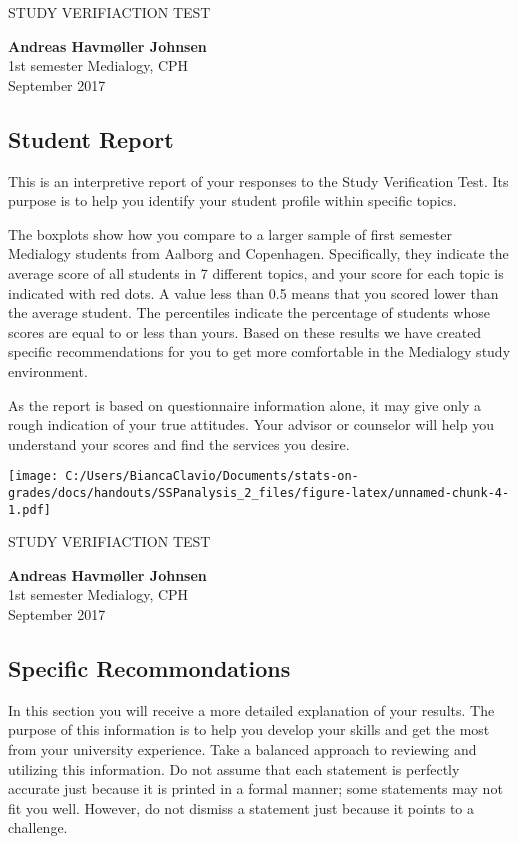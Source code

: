 \documentclass[]{article}
\title{}
\author{}
\date{}
\begin{document}
STUDY VERIFIACTION TEST

\textbf{Andreas Havmøller Johnsen}\\
1st semester Medialogy, CPH\\
September 2017

\subsection{Student Report}\label{student-report}

This is an interpretive report of your responses to the Study
Verification Test. Its purpose is to help you identify your student
profile within specific topics.

The boxplots show how you compare to a larger sample of first semester
Medialogy students from Aalborg and Copenhagen. Specifically, they
indicate the average score of all students in 7 different topics, and
your score for each topic is indicated with red dots. A value less than
0.5 means that you scored lower than the average student. The
percentiles indicate the percentage of students whose scores are equal
to or less than yours. Based on these results we have created specific
recommendations for you to get more comfortable in the Medialogy study
environment.

As the report is based on questionnaire information alone, it may give
only a rough indication of your true attitudes. Your advisor or
counselor will help you understand your scores and find the services you
desire.

\texttt{[image: C:/Users/BiancaClavio/Documents/stats-on-grades/docs/handouts/SSPanalysis\_2\_files/figure-latex/unnamed-chunk-4-1.pdf]}

\pagebreak

STUDY VERIFIACTION TEST

\textbf{Andreas Havmøller Johnsen}\\
1st semester Medialogy, CPH\\
September 2017

\subsection{Specific Recommondations}\label{specific-recommondations}

In this section you will receive a more detailed explanation of your
results. The purpose of this information is to help you develop your
skills and get the most from your university experience. Take a balanced
approach to reviewing and utilizing this information. Do not assume that
each statement is perfectly accurate just because it is printed in a
formal manner; some statements may not fit you well. However, do not
dismiss a statement just because it points to a challenge.
\end{document}
